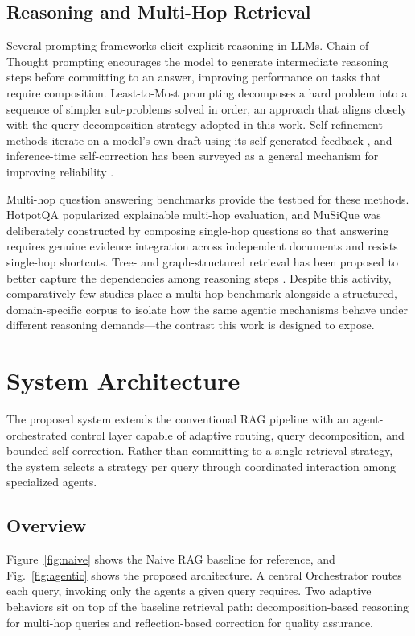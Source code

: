 \documentclass[conference]{IEEEtran}
\begin{document}
\subsection{Reasoning and Multi-Hop Retrieval}
Several prompting frameworks elicit explicit reasoning in LLMs. Chain-of-Thought prompting \cite{wei2022cot} encourages the model to generate intermediate reasoning steps before committing to an answer, improving performance on tasks that require composition. Least-to-Most prompting \cite{zhou2023leasttomost} decomposes a hard problem into a sequence of simpler sub-problems solved in order, an approach that aligns closely with the query decomposition strategy adopted in this work. Self-refinement methods iterate on a model's own draft using its self-generated feedback \cite{madaan2023selfrefine}, and inference-time self-correction has been surveyed as a general mechanism for improving reliability \cite{hu2024selfcorrection}.

Multi-hop question answering benchmarks provide the testbed for these methods. HotpotQA \cite{yang2018hotpotqa} popularized explainable multi-hop evaluation, and MuSiQue \cite{trivedi2022musique} was deliberately constructed by composing single-hop questions so that answering requires genuine evidence integration across independent documents and resists single-hop shortcuts. Tree- and graph-structured retrieval has been proposed to better capture the dependencies among reasoning steps \cite{shi2026reasoning}. Despite this activity, comparatively few studies place a multi-hop benchmark alongside a structured, domain-specific corpus to isolate how the same agentic mechanisms behave under different reasoning demands---the contrast this work is designed to expose.

\section{System Architecture}
The proposed system extends the conventional RAG pipeline with an agent-orchestrated control layer capable of adaptive routing, query decomposition, and bounded self-correction. Rather than committing to a single retrieval strategy, the system selects a strategy per query through coordinated interaction among specialized agents.

\subsection{Overview}
Figure~\ref{fig:naive} shows the Naive RAG baseline for reference, and Fig.~\ref{fig:agentic} shows the proposed architecture. A central Orchestrator routes each query, invoking only the agents a given query requires. Two adaptive behaviors sit on top of the baseline retrieval path: decomposition-based reasoning for multi-hop queries and reflection-based correction for quality assurance.
\end{document}

